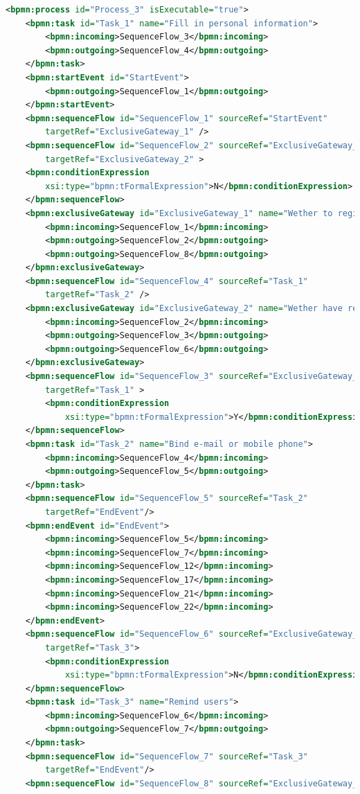 \documentclass[runningheads]{llncs}
\begin{document}
    \noindent 
    \begin{lstlisting}[language={XML}]
        <bpmn:process id="Process_3" isExecutable="true">
	<bpmn:task id="Task_1" name="Fill in personal information">
		<bpmn:incoming>SequenceFlow_3</bpmn:incoming>
		<bpmn:outgoing>SequenceFlow_4</bpmn:outgoing>
	</bpmn:task>
	<bpmn:startEvent id="StartEvent">
		<bpmn:outgoing>SequenceFlow_1</bpmn:outgoing>
	</bpmn:startEvent>
	<bpmn:sequenceFlow id="SequenceFlow_1" sourceRef="StartEvent"
		targetRef="ExclusiveGateway_1" />
	<bpmn:sequenceFlow id="SequenceFlow_2" sourceRef="ExclusiveGateway_1"
		targetRef="ExclusiveGateway_2" >
	<bpmn:conditionExpression
		xsi:type="bpmn:tFormalExpression">N</bpmn:conditionExpression>
	</bpmn:sequenceFlow>
	<bpmn:exclusiveGateway id="ExclusiveGateway_1" name="Wether to register">
		<bpmn:incoming>SequenceFlow_1</bpmn:incoming>
		<bpmn:outgoing>SequenceFlow_2</bpmn:outgoing>
		<bpmn:outgoing>SequenceFlow_8</bpmn:outgoing>
	</bpmn:exclusiveGateway>
	<bpmn:sequenceFlow id="SequenceFlow_4" sourceRef="Task_1"
		targetRef="Task_2" />
	<bpmn:exclusiveGateway id="ExclusiveGateway_2" name="Wether have registered">
		<bpmn:incoming>SequenceFlow_2</bpmn:incoming>
		<bpmn:outgoing>SequenceFlow_3</bpmn:outgoing>
		<bpmn:outgoing>SequenceFlow_6</bpmn:outgoing>
	</bpmn:exclusiveGateway>
	<bpmn:sequenceFlow id="SequenceFlow_3" sourceRef="ExclusiveGateway_2"
		targetRef="Task_1" >
		<bpmn:conditionExpression
			xsi:type="bpmn:tFormalExpression">Y</bpmn:conditionExpression>
	</bpmn:sequenceFlow>
	<bpmn:task id="Task_2" name="Bind e-mail or mobile phone">
		<bpmn:incoming>SequenceFlow_4</bpmn:incoming>
		<bpmn:outgoing>SequenceFlow_5</bpmn:outgoing>
	</bpmn:task>
	<bpmn:sequenceFlow id="SequenceFlow_5" sourceRef="Task_2"
		targetRef="EndEvent"/>
	<bpmn:endEvent id="EndEvent">
		<bpmn:incoming>SequenceFlow_5</bpmn:incoming>
		<bpmn:incoming>SequenceFlow_7</bpmn:incoming>
		<bpmn:incoming>SequenceFlow_12</bpmn:incoming>
		<bpmn:incoming>SequenceFlow_17</bpmn:incoming>
		<bpmn:incoming>SequenceFlow_21</bpmn:incoming>
		<bpmn:incoming>SequenceFlow_22</bpmn:incoming>
	</bpmn:endEvent>
	<bpmn:sequenceFlow id="SequenceFlow_6" sourceRef="ExclusiveGateway_2"
		targetRef="Task_3">
		<bpmn:conditionExpression
			xsi:type="bpmn:tFormalExpression">N</bpmn:conditionExpression>
	</bpmn:sequenceFlow>
	<bpmn:task id="Task_3" name="Remind users">
		<bpmn:incoming>SequenceFlow_6</bpmn:incoming>
		<bpmn:outgoing>SequenceFlow_7</bpmn:outgoing>
	</bpmn:task>
	<bpmn:sequenceFlow id="SequenceFlow_7" sourceRef="Task_3"
		targetRef="EndEvent"/>
	<bpmn:sequenceFlow id="SequenceFlow_8" sourceRef="ExclusiveGateway_1"

\end{lstlisting}
\end{document}
